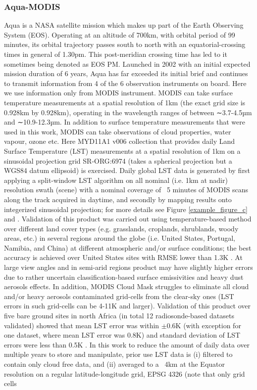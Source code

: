 \documentclass[hess, twostagejnl]{copernicus}
\begin{document}
\subsubsection{Aqua-MODIS}


\noindent Aqua  \citep{aquaref} is a NASA satellite mission which makes up part of the Earth Observing System (EOS). Operating at an altitude of 700km, with orbital period of 99 minutes, its orbital trajectory passes south to north with an equatorial-crossing times in general of 1.30pm. This post-meridian crossing time has led to it sometimes being denoted as EOS PM. Launched in 2002 with an initial expected mission duration of 6 years, Aqua has far exceeded its initial brief and continues to transmit information from 4 of the 6 observation instruments on board. Here we use information only from MODIS instrument. MODIS can take surface temperature measurements at a spatial resolution of 1km (the exact grid size is 0.928km by 0.928km), operating in the wavelength ranges of between ∼3.7-4.5µm and ∼10.9-12.3µm. In addition to surface temperature measurements that were used in this work, MODIS can take observations of cloud properties, water vapour, ozone etc. Here MYD11A1 v006 \citep{MODISusersguide} collection that provides daily Land Surface Temperature (LST) measurements at a spatial resolution of 1km on a sinusoidal projection grid SR-ORG:6974 (takes a spherical projection but a WGS84 datum ellipsoid) is exercised. Daily global LST data is generated by first applying a split-window LST algorithm \citep{508406} on all nominal (i.e. 1km at nadir) resolution swath (scene) with a nominal coverage of ~5 minutes of MODIS scans along the track acquired in daytime, and secondly by mapping results onto integerized sinusoidal projection; for more details see Figure \ref{example_figure_c} and \citep{MODISusersguide}. Validation of this product was carried out using temperature-based method over different land cover types (e.g. grasslands, croplands, shrublands, woody areas, etc.) in several regions around the globe (i.e. United States, Portugal, Namibia, and China) at different atmospheric and/or surface conditions; the best accuracy is achieved over United States sites with RMSE lower than 1.3K \citep{DUAN201916}. At large view angles and in semi-arid regions product may have slightly higher errors due to rather uncertain classification-based surface emissivities and heavy dust aerosols effects. In addition, MODIS Cloud Mask struggles to eliminate all cloud and/or heavy aerosols contaminated grid-cells from the clear-sky ones (LST errors in such grid-cells can be 4-11K and larger). Validation of this product over five bare ground sites in north Africa (in total 12 radiosonde-based datasets validated) showed that mean LST error was within $\pm$0.6K (with exception for one dataset, where mean LST error was 0.8K) and standard deviation of LST errors were less than 0.5K \cite{DUAN201916}. In this work to reduce the amount of daily data over multiple years to store and manipulate, prior use LST data is (i) filtered to contain only cloud free data, and (ii) averaged to a ~4km at the Equator resolution on a regular latitude-longitude grid, EPSG 4326 (note that only grid cells 
\end{document}
